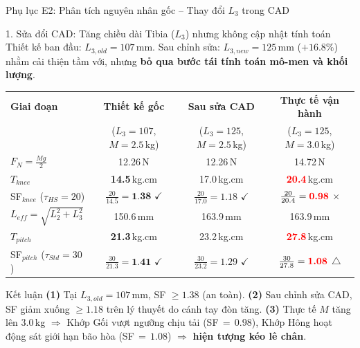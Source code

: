 \documentclass[10pt,aspectratio=169]{beamer}
\begin{document}
\begin{frame}{Phụ lục E2: Phân tích nguyên nhân gốc -- Thay đổi $L_3$ trong CAD}
  \begin{block}{1. Sửa đổi CAD: Tăng chiều dài Tibia ($L_3$) nhưng không cập nhật tính toán}
      {\footnotesize Thiết kế ban đầu: $L_{3,old} = 107\,$mm. Sau chỉnh sửa: $L_{3,new} = 125\,$mm ($+16.8\%$) nhằm cải thiện tầm với, nhưng \textbf{bỏ qua bước tái tính toán mô-men và khối lượng}.}
  \end{block}
  {\scriptsize
  \def\arraystretch{1.1}
  \centering
  \begin{tabular}{|l|c|c|c|}
      \hline
      \textbf{Giai đoạn} & \textbf{Thiết kế gốc} & \textbf{Sau sửa CAD} & \textbf{Thực tế vận hành} \\
      & ($L_3\!=\!107$, $M\!=\!2.5$\,kg) & ($L_3\!=\!125$, $M\!=\!2.5$\,kg) & ($L_3\!=\!125$, $M\!=\!3.0$\,kg) \\
      \hline
      $F_N = \frac{Mg}{2}$ & 12.26\,N & 12.26\,N & 14.72\,N \\
      \hline
      $T_{knee}$ & \textbf{14.5}\,kg.cm & 17.0\,kg.cm & \textcolor{red}{\textbf{20.4}}\,kg.cm \\
      \hline
      SF$_{knee}$ {\tiny ($\tau_{HS}\!=\!20$)} & $\frac{20}{14.5} = \textbf{1.38}$ $\checkmark$ & $\frac{20}{17.0} = 1.18$ $\checkmark$ & $\frac{20}{20.4} = \textcolor{red}{\textbf{0.98}}$ $\times$ \\
      \hline
      $L_{eff} = \sqrt{L_2^2 + L_3^2}$ & 150.6\,mm & 163.9\,mm & 163.9\,mm \\
      \hline
      $T_{pitch}$ & \textbf{21.3}\,kg.cm & 23.2\,kg.cm & \textcolor{red}{\textbf{27.8}}\,kg.cm \\
      \hline
      SF$_{pitch}$ {\tiny ($\tau_{Std}\!=\!30$)} & $\frac{30}{21.3} = \textbf{1.41}$ $\checkmark$ & $\frac{30}{23.2} = 1.29$ $\checkmark$ & $\frac{30}{27.8} = \textcolor{red}{\textbf{1.08}}$ $\triangle$ \\
      \hline
  \end{tabular}
  }
  \begin{alertblock}{Kết luận}
      {\footnotesize \textbf{(1)} Tại $L_{3,old}\!=\!107\,$mm, SF $\ge 1.38$ (an toàn). \textbf{(2)} Sau chỉnh sửa CAD, SF giảm xuống $\ge 1.18$ trên lý thuyết do cánh tay đòn tăng. \textbf{(3)} Thực tế $M$ tăng lên $3.0\,$kg $\Rightarrow$ Khớp Gối vượt ngưỡng chịu tải (SF$\,=\,0.98$), Khớp Hông hoạt động sát giới hạn bão hòa (SF$\,=\,1.08$) $\Rightarrow$ \textbf{hiện tượng kéo lê chân}.}
  \end{alertblock}
\end{frame}
\end{document}
